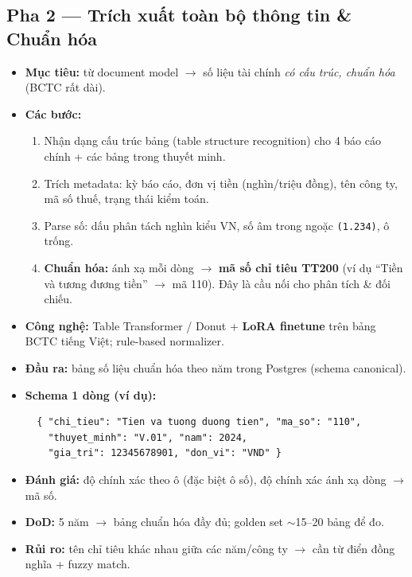 \documentclass[11pt,a4paper]{article}
\newcommand{\pha}[1]{\subsection{#1}}
\begin{document}
\pha{Pha 2 --- Trích xuất toàn bộ thông tin \& Chuẩn hóa}
\begin{itemize}
  \item \textbf{Mục tiêu:} từ document model $\rightarrow$ số liệu tài chính \emph{có cấu trúc, chuẩn hóa} (BCTC rất dài).
  \item \textbf{Các bước:}
  \begin{enumerate}
    \item Nhận dạng cấu trúc bảng (table structure recognition) cho 4 báo cáo chính + các bảng trong thuyết minh.
    \item Trích metadata: kỳ báo cáo, đơn vị tiền (nghìn/triệu đồng), tên công ty, mã số thuế, trạng thái kiểm toán.
    \item Parse số: dấu phân tách nghìn kiểu VN, số âm trong ngoặc \texttt{(1.234)}, ô trống.
    \item \textbf{Chuẩn hóa:} ánh xạ mỗi dòng $\rightarrow$ \textbf{mã số chỉ tiêu TT200} (ví dụ ``Tiền và tương đương tiền'' $\rightarrow$ mã 110). Đây là cầu nối cho phân tích \& đối chiếu.
  \end{enumerate}
  \item \textbf{Công nghệ:} Table Transformer / Donut + \textbf{LoRA finetune} trên bảng BCTC tiếng Việt; rule-based normalizer.
  \item \textbf{Đầu ra:} bảng số liệu chuẩn hóa theo năm trong Postgres (schema canonical).
  \item \textbf{Schema 1 dòng (ví dụ):}
  \begin{verbatim}
  { "chi_tieu": "Tien va tuong duong tien", "ma_so": "110",
    "thuyet_minh": "V.01", "nam": 2024,
    "gia_tri": 12345678901, "don_vi": "VND" }
  \end{verbatim}
  \item \textbf{Đánh giá:} độ chính xác theo ô (đặc biệt ô số), độ chính xác ánh xạ dòng $\rightarrow$ mã số.
  \item \textbf{DoD:} 5 năm $\rightarrow$ bảng chuẩn hóa đầy đủ; golden set $\sim$15--20 bảng để đo.
  \item \textbf{Rủi ro:} tên chỉ tiêu khác nhau giữa các năm/công ty $\rightarrow$ cần từ điển đồng nghĩa + fuzzy match.
\end{itemize}
\end{document}
